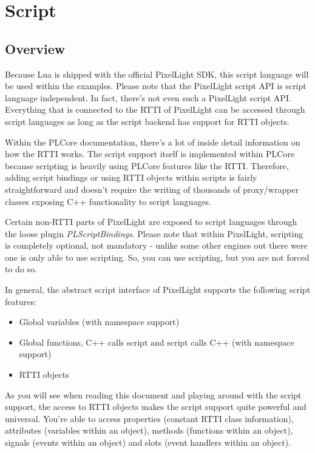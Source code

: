 \chapter{Script}




\section{Overview}
Because Lua is shipped with the official PixelLight SDK, this script language will be used within the examples. Please note that the PixelLight script API is script language independent. In fact, there's not even such a PixelLight script API. Everything that is connected to the RTTI of PixelLight can be accessed through script languages as long as the script backend has support for RTTI objects.

Within the PLCore documentation, there's a lot of inside detail information on how the RTTI works. The script support itself is implemented within PLCore because scripting is heavily using PLCore features like the RTTI. Therefore, adding script bindings or using RTTI objects within scripts is fairly straightforward and doesn't require the writing of thousands of proxy/wrapper classes exposing C++ functionality to script languages.

Certain non-RTTI parts of PixelLight are exposed to script languages through the loose plugin \emph{PLScriptBindings}. Please note that within PixelLight, scripting is completely optional, not mandatory - unlike some other engines out there were one is only able to use scripting. So, you can use scripting, but you are not forced to do so.

In general, the abstract script interface of PixelLight supports the following script features:
\begin{itemize}
\item{Global variables (with namespace support)}
\item{Global functions, C++ calls script and script calls C++ (with namespace support)}
\item{RTTI objects}
\end{itemize}

As you will see when reading this document and playing around with the script support, the access to RTTI objects makes the script support quite powerful and universal. You're able to access properties (constant RTTI class information), attributes (variables within an object), methods (functions within an object), signals (events within an object) and slots (event handlers within an object).

